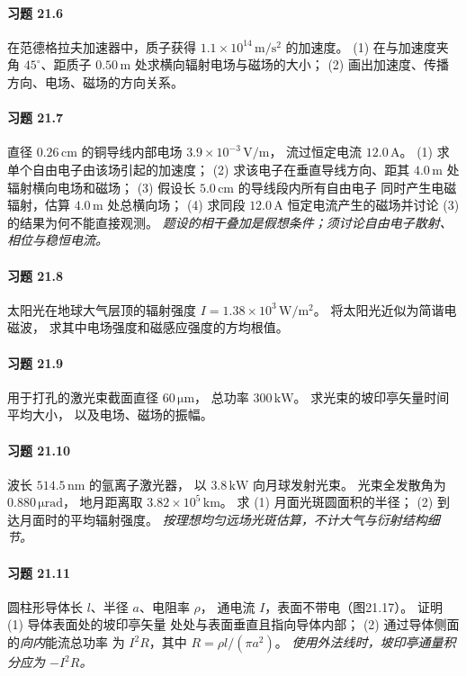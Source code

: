 \paragraph{习题 21.6}
在范德格拉夫加速器中，质子获得
\(1.1\times10^{14}\,\mathrm{m/s^2}\) 的加速度。
(1) 在与加速度夹角 \(45^\circ\)、距质子 \(0.50\,\mathrm m\)
处求横向辐射电场与磁场的大小；
(2) 画出加速度、传播方向、电场、磁场的方向关系。

\paragraph{习题 21.7}
直径 \(0.26\,\mathrm{cm}\) 的铜导线内部电场
\(3.9\times10^{-3}\,\mathrm{V/m}\)，
流过恒定电流 \(12.0\,\mathrm A\)。
(1) 求单个自由电子由该场引起的加速度；
(2) 求该电子在垂直导线方向、距其 \(4.0\,\mathrm m\)
处辐射横向电场和磁场；
(3) 假设长 \(5.0\,\mathrm{cm}\) 的导线段内所有自由电子
同时产生电磁辐射，估算 \(4.0\,\mathrm m\) 处总横向场；
(4) 求同段 \(12.0\,\mathrm A\) 恒定电流产生的磁场并讨论
(3) 的结果为何不能直接观测。
\textit{题设的相干叠加是假想条件；须讨论自由电子散射、相位与稳恒电流。}

\paragraph{习题 21.8}
太阳光在地球大气层顶的辐射强度
\(I=1.38\times10^3\,\mathrm{W/m^2}\)。
将太阳光近似为简谐电磁波，
求其中电场强度和磁感应强度的方均根值。

\paragraph{习题 21.9}
用于打孔的激光束截面直径 \(60\,\mathrm{\mu m}\)，
总功率 \(300\,\mathrm{kW}\)。
求光束的坡印亭矢量时间平均大小，
以及电场、磁场的振幅。

\paragraph{习题 21.10}
波长 \(514.5\,\mathrm{nm}\) 的氩离子激光器，
以 \(3.8\,\mathrm{kW}\) 向月球发射光束。
光束全发散角为 \(0.880\,\mathrm{\mu rad}\)，
地月距离取 \(3.82\times10^5\,\mathrm{km}\)。
求 (1) 月面光斑圆面积的半径；
(2) 到达月面时的平均辐射强度。
\textit{按理想均匀远场光斑估算，不计大气与衍射结构细节。}

\paragraph{习题 21.11}
圆柱形导体长 \(l\)、半径 \(a\)、电阻率 \(\rho\)，
通电流 \(I\)，表面不带电（图21.17）。
证明 (1) 导体表面处的坡印亭矢量
处处与表面垂直且指向导体内部；
(2) 通过导体侧面的\emph{向内}能流总功率
为 \(I^2R\)，其中 \(R=\rho l/(\pi a^2)\)。
\textit{使用外法线时，坡印亭通量积分应为 \(-I^2R\)。}

